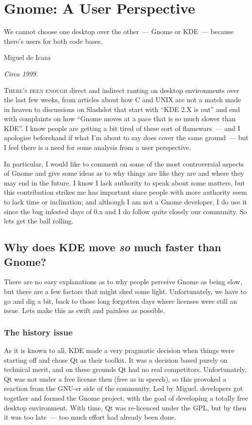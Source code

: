 \documentclass{book}
\begin{document}
\chapter{Gnome: A User Perspective}

\epigraph{We cannot choose one desktop over the other~--- Gnome or
  KDE~--- because there's users for both code bases.}{Miguel de Icaza}

\begin{flushright}
  \emph{Circa 1999.}
\end{flushright}

\lettrine{T}{here's been enough} direct and indirect ranting on
desktop environments over the last few weeks, from articles about how
C and UNIX are not a match made in heaven to discussions on Slashdot
that start with ``KDE 2.X is out'' and end with complaints on how
``Gnome moves at a pace that is so much slower than KDE''. I know
people are getting a bit tired of these sort of flamewars~--- and I
apologise beforehand if what I'm about to say does cover the same
ground~--- but I feel there is a need for some analysis from a user
perspective.

In particular, I would like to comment on some of the most
controversial aspects of Gnome and give some ideas as to why things
are like they are and where they may end in the future. I know I lack
authority to speak about some matters, but this contribution strikes
me has important since people with more authority seem to lack time or
inclination; and although I am not a Gnome developer, I do use it
since the bug infested days of 0.x and I do follow quite closely our
community. So lets get the ball rolling.

\section{Why does KDE move \emph{so} much faster than Gnome?}

There are no easy explanations as to why people perceive Gnome as
being slow, but there are a few factors that might shed some
light. Unfortunately, we have to go and dig a bit, back to those long
forgotten days where licenses were still an issue. Lets make this as
swift and painless as possible.

\subsection{The history issue}

As it is known to all, KDE made a very pragmatic decision when things
were starting off and chose Qt as their toolkit. It was a decision
based purely on technical merit, and on these grounds Qt had no real
competitors. Unfortunately, Qt was not under a free license then (free
as in speech), so this provoked a reaction from the GNU-er side of the
community. Led by Miguel, developers got together and formed the Gnome
project, with the goal of developing a totally free desktop
environment. With time, Qt was re-licenced under the GPL, but by then
it was too late~--- too much effort had already been done.
\end{document}
